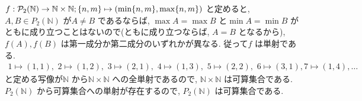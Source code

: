 \documentclass[10pt, fleqn, label-section=none]{bxjsarticle}
\theoremstyle{definition}
\newcommand{\cbra}[1]{\mleft\{#1\mright\}}
\renewcommand{\;}{\, ; \,}
\begin{document}
\section{}
$f: \mathcal P_2 (\mathbb N) \rightarrow \mathbb N \times \mathbb N  ;  \cbra{n, m} \mapsto (\min \cbra{n, m}  , \max \cbra{n, m})$ と定めると, $A, B \in P_2 (\mathbb N)$ が$A \neq B$ であるならば, $\max A = \max B$ と$\min A = \min B$ がともに成り立つことはないので(ともに成り立つならば, $A = B$ となるから), $f(A), f(B)$ は第一成分か第二成分のいずれかが異なる. 従って$f$ は単射である. 
\begin{align*} 1 \mapsto (1, 1), \,\, 2 \mapsto (1, 2), \,\, 3 \mapsto (2, 1), \,\, 4 \mapsto(1, 3), \,\, 5 \mapsto (2,2), \,\, 6 \mapsto (3, 1), 7 \mapsto(1, 4), \ldots  \end{align*}  
と定める写像が$\mathbb N $ から$\mathbb N \times \mathbb N$ への全単射であるので, $\mathbb N \times \mathbb N$ は可算集合である. $P_2 ( \mathbb N) $ から可算集合への単射が存在するので, $P_2 (\mathbb N) $ は可算集合である. 
\end{document}
